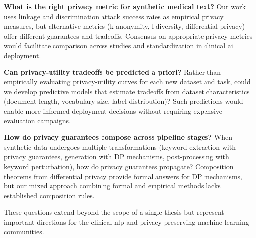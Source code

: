 \textbf{What is the right privacy metric for synthetic medical text?}
Our work uses linkage and discrimination attack success rates as empirical privacy measures, but alternative metrics (k-anonymity, l-diversity, differential privacy) offer different guarantees and tradeoffs.
Consensus on appropriate privacy metrics would facilitate comparison across studies and standardization in clinical \gls{ai} deployment.

\textbf{Can privacy-utility tradeoffs be predicted a priori?}
Rather than empirically evaluating privacy-utility curves for each new dataset and task, could we develop predictive models that estimate tradeoffs from dataset characteristics (document length, vocabulary size, label distribution)?
Such predictions would enable more informed deployment decisions without requiring expensive evaluation campaigns.

\textbf{How do privacy guarantees compose across pipeline stages?}
When synthetic data undergoes multiple transformations (keyword extraction with privacy guarantees, generation with DP mechanisms, post-processing with keyword perturbation), how do privacy guarantees propagate?
Composition theorems from differential privacy provide formal answers for DP mechanisms, but our mixed approach combining formal and empirical methods lacks established composition rules.

These questions extend beyond the scope of a single thesis but represent important directions for the clinical \gls{nlp} and privacy-preserving machine learning communities.
